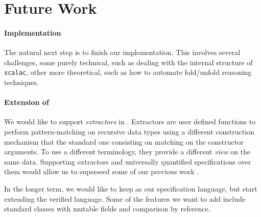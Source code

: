 \section{Future Work}
\paragraph{Implementation}
The natural next step is to finish our implementation. This involves several
challenges, some purely technical, such as dealing with the internal structure
of {\tt scalac}, other more theoretical, such as how to automate fold/unfold
reasoning techniques.

\paragraph{Extension of {\purescala}}
We would like to support \emph{extractors} \cite{burak06mop}in {\purescala}. Extractors are user
defined functions to perform pattern-matching on recursive data types using a
different construction mechanism that the standard one consisting on matching
on the constructor arguments. To use a different terminology, they provide a
different \emph{view} on the same data. Supporting extractors and universally
quantified specifications over them would allow us to superseed some of our
previous work \cite{dotta08pm}.

In the longer term, we would like to keep {\purescala} as our specification
language, but start extending the verified language. Some of the features we
want to add include standard classes with mutable fields and comparison by
reference.
